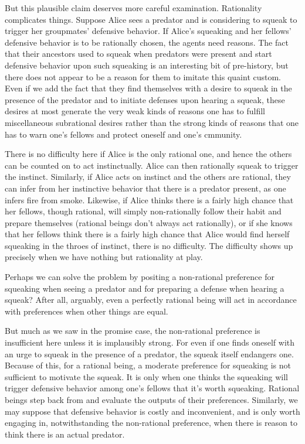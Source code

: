 But this plausible claim deserves more careful examination. Rationality complicates things. Suppose Alice sees a 
predator and is considering to squeak to trigger her groupmates' defensive behavior. If Alice's squeaking and her fellows' 
defensive behavior is to be rationally chosen, the agents need reasons. The fact that their ancestors used to squeak 
when predators were present and start defensive behavior upon such squeaking is an interesting bit of pre-history,
but there does not appear to be a reason for them to imitate this quaint custom. Even if we add the fact that they
find themselves with a desire to squeak in the presence of the predator and to initiate defenses upon hearing a squeak,
these desires at most generate the very weak kinds of reasons one has to fulfill miscellaneous subrational desires rather 
than the strong kinds of reasons that one has to warn one's fellows and protect oneself and one's cmmunity. 

There is no difficulty here if Alice is the only rational one, and hence the others can be counted on to act instinctually. Alice can
then rationally squeak to trigger the instinct. Similarly, if Alice acts on instinct and the others are rational, they
can infer from her instinctive behavior that there is a predator present, as one infers fire from smoke. Likewise, if Alice thinks there is a fairly high chance that her
fellows, though rational, will simply non-rationally follow their habit and prepare themselves (rational beings don't
always act rationally), or if she knows that her fellows think there is a fairly high 
chance that Alice would find herself squeaking in the throes of instinct, there is no difficulty. The difficulty shows
up precisely when we have nothing but rationality at play.

Perhaps we can solve the problem by positing a non-rational preference for squeaking when seeing a predator and for
preparing a defense when hearing a squeak? After all, arguably, even a perfectly rational being will act in accordance
with preferences when other things are equal. 

But much as we saw in the promise case, the non-rational preference is insufficient here unless it is implausibly strong. For even if one finds oneself
with an urge to squeak in the presence of a predator, the squeak itself endangers one. Because of this, for a rational
being, a moderate preference for squeaking is not sufficient to motivate the squeak. It is only when one thinks the
squeaking will trigger defensive behavior among one's fellows that it's worth squeaking. Rational beings step back
from and evaluate the outputs of their preferences. Similarly, we may suppose that
defensive behavior is costly and inconvenient, and is only worth engaging in, notwithstanding the non-rational preference,
when there is reason to think there is an actual predator.

